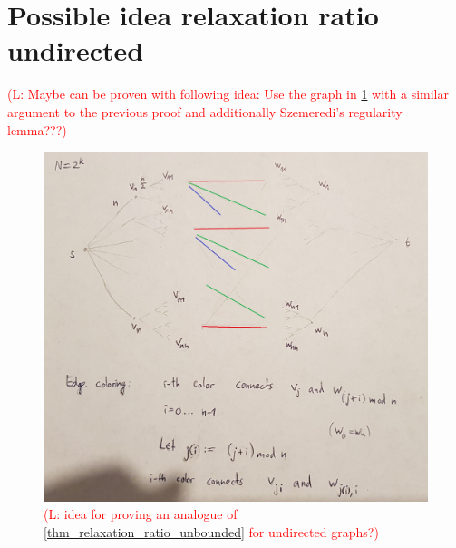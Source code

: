 \documentclass[runningheads]{llncs}
\numberwithin{equation}{section}
\newcommand{\comment}[1]{\textcolor{red}{(L: #1)}}
\begin{document}
\section{Possible idea relaxation ratio undirected}

\comment{Maybe can be proven with following idea: Use the graph in \cref{fig_undirected_relaxation_ratio} with a similar argument to the previous proof and additionally Szemeredi's regularity lemma???}
\begin{figure}[htpb]
\centering
\includegraphics[width=\textwidth]{img/idea_undirected_approximation_ratio.jpg}
\caption{\comment{idea for proving an analogue of \cref{thm_relaxation_ratio_unbounded} for undirected graphs?}}
\label{fig_undirected_relaxation_ratio}
\end{figure}
\end{document}
